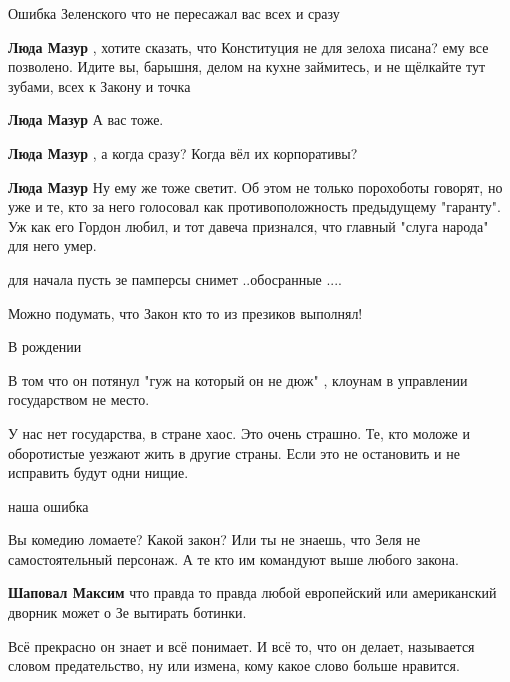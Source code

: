\begin{itemize}
\begin{itemize}
\end{itemize} %

Ошибка Зеленского что не пересажал вас всех и сразу

\begin{itemize} %
\textbf{Люда Мазур} , хотите сказать, что Конституция не для зелоха писана? ему все позволено. Идите вы, барышня, делом на кухне займитесь, и не щёлкайте тут зубами, всех к Закону и точка

\textbf{Люда Мазур} А вас тоже.


\textbf{Люда Мазур} , а когда сразу? Когда вёл их корпоративы?

\textbf{Люда Мазур} Ну ему же тоже светит. Об этом не только порохоботы говорят, но уже и те, кто за него голосовал как противоположность предыдущему "гаранту". Уж как его Гордон любил, и тот давеча признался, что главный "слуга народа" для него умер.


для начала пусть зе памперсы снимет ..обосранные ....
\end{itemize} %

Можно подумать, что Закон кто то из презиков выполнял!

В рождении

В том что он потянул "гуж на который он не дюж" , клоунам в управлении государством не место.


У нас нет государства, в стране хаос. Это очень страшно. Те, кто моложе и
оборотистые уезжают жить в другие страны. Если это не остановить и не исправить
будут одни нищие.


наша ошибка


Вы комедию ломаете? Какой закон? Или ты не знаешь, что Зеля не самостоятельный
персонаж. А те кто им командуют выше любого закона.

\begin{itemize} %
\textbf{Шаповал Максим} что правда то правда любой европейский или американский дворник может о Зе вытирать ботинки.
\end{itemize} %


Всё прекрасно он знает и всё понимает. И всё то, что он делает, называется
словом предательство, ну или измена, кому какое слово больше нравится.


\end{itemize}
